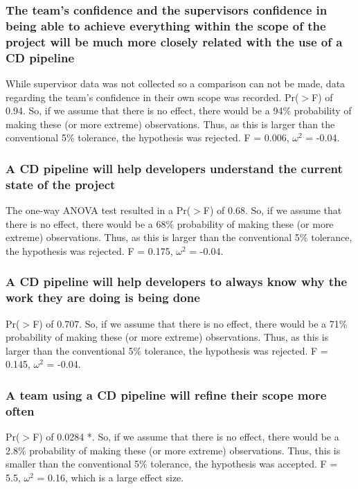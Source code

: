 \documentclass[journal]{IEEEtran}
\begin{document}
        \subsubsection{The team's confidence and the supervisors confidence in being able to achieve everything within the scope of the project will be much more closely related with the use of a CD pipeline}
            While supervisor data was not collected so a comparison can not be made, data regarding the team's confidence in their own scope was recorded. Pr($>$F) of 0.94. So, if we assume that there is no effect, there would be a 94\% probability of making these (or more extreme) observations. Thus, as this is larger than the conventional 5\% tolerance, the hypothesis was rejected. F = 0.006, $\omega^2$ = -0.04. \\

        \subsubsection{A CD pipeline will help developers understand the current state of the project}
            The one-way ANOVA test resulted in a Pr($>$F) of 0.68. So, if we assume that there is no effect, there would be a 68\% probability of making these (or more extreme) observations. Thus, as this is larger than the conventional 5\% tolerance, the hypothesis was rejected. F = 0.175, $\omega^2$ = -0.04. \\

        \subsubsection{A CD pipeline will help developers to always know why the work they are doing is being done}
            Pr($>$F) of 0.707. So, if we assume that there is no effect, there would be a 71\% probability of making these (or more extreme) observations. Thus, as this is larger than the conventional 5\% tolerance, the hypothesis was rejected. F = 0.145, $\omega^2$ = -0.04. \\

        \subsubsection{A team using a CD pipeline will refine their scope more often}
            Pr($>$F) of 0.0284 *. So, if we assume that there is no effect, there would be a 2.8\% probability of making these (or more extreme) observations. Thus, this is smaller than the conventional 5\% tolerance, the hypothesis was accepted. F = 5.5, $\omega^2$ = 0.16, which is a large effect size. \\
\end{document}
